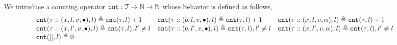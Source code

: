 We introduce a counting operator $\mathtt{cnt} : \mathcal{T} \to \mathbb{N} \to \mathbb{N}$ whose behavior is defined as follows,
\[
\begin{array}{lll}
\mathtt{cnt}(\mathtt{\tau} :: (x, l, v, \bullet), l ) \triangleq \mathtt{cnt}(\mathtt{\tau}, l) + 1
&
\mathtt{cnt}(\mathtt{\tau}  ::(b, l, v, \bullet), l) \triangleq \mathtt{cnt}(\mathtt{\tau}, l) + 1
&
\mathtt{cnt}(\mathtt{\tau}  :: (x, l, v, \alpha), l) \triangleq \mathtt{cnt}(\mathtt{\tau}, l) + 1
\\
\mathtt{cnt}(\mathtt{\tau}  :: (x, l', v, \bullet), l) \triangleq \mathtt{cnt}(\mathtt{\tau}, l), l' \neq l
&
\mathtt{cnt}(\mathtt{\tau}  :: (b, l', v, \bullet), l) \triangleq \mathtt{cnt}(\mathtt{\tau}, l), l' \neq l
&
\mathtt{cnt}(\mathtt{\tau}  :: (x, l', v, \alpha), l) \triangleq \mathtt{cnt}(\mathtt{\tau}, l), l' \neq l
\\
\mathtt{cnt}({[]}, l) \triangleq 0
&&
\end{array}
\]
%
%
